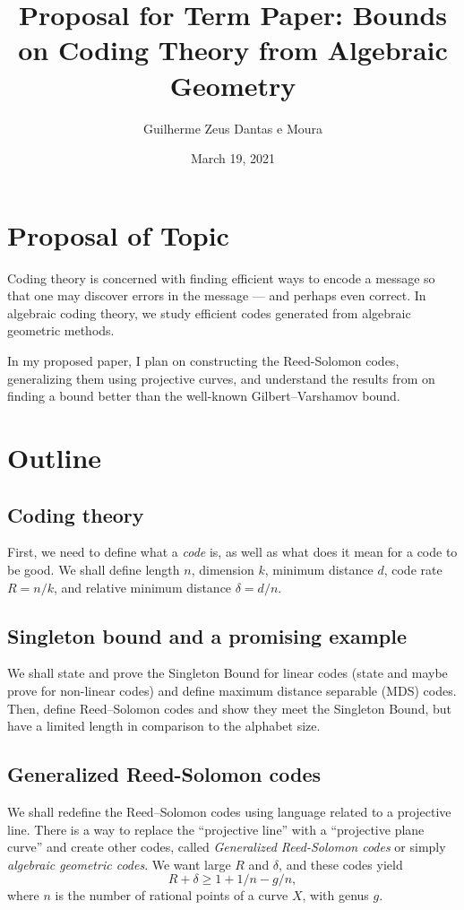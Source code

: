 \documentclass[11pt, letterpaper]{amsart}
\title{Proposal for Term Paper: Bounds on Coding Theory from Algebraic Geometry}
\author{Guilherme Zeus Dantas e Moura}
\date{March 19, 2021}
\begin{document}
\maketitle


\section{Proposal of Topic}
    Coding theory is concerned with finding efficient ways to encode a message so that one may discover errors in the message --- and perhaps even correct. In algebraic coding theory, we study efficient codes generated from algebraic geometric methods.
    
    In my proposed paper, I plan on constructing the Reed-Solomon codes, generalizing them using projective curves, and understand the results from \cite{TVZ82} on finding a bound better than the well-known Gilbert--Varshamov bound.
    
\section{Outline}

\subsection{Coding theory} \label{ss:codingtheory}
First, we need to define what a \emph{code} is, as well as what does it mean for a code to be good. We shall define length $n$, dimension $k$, minimum distance $d$, code rate $R = n/k$, and relative minimum distance $\delta = d/n$.

\subsection{Singleton bound and a promising example} \label{ss:singleton}
We shall state and prove the Singleton Bound for linear codes (state and maybe prove for non-linear codes) and define maximum distance separable (MDS) codes. Then, define Reed--Solomon codes and show they meet the Singleton Bound, but have a limited length in comparison to the alphabet size.

\subsection{Generalized Reed-Solomon codes} \label{ss:grs}
We shall redefine the Reed--Solomon codes using language related to a projective line. There is a way to replace the ``projective line'' with a ``projective plane curve'' and create other codes, called \emph{Generalized Reed-Solomon codes} or simply \emph{algebraic geometric codes}. We want large $R$ and $\delta$, and these codes yield \begin{equation}\label{eq:g/n} R + \delta \ge 1 + 1/n - g/n,\end{equation} where $n$ is the number of rational points of a curve $X$, with genus $g$.
\end{document}
